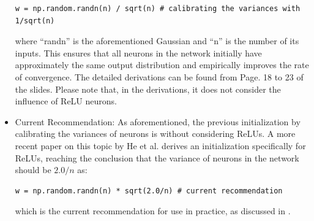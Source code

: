 \documentclass[11pt,fleqn, UTF8]{ctexbook} %
\begin{document}
\begin{itemize}
  \lstset{language=python}
  \begin{lstlisting}[frame=single]
  w = np.random.randn(n) / sqrt(n) # calibrating the variances with 1/sqrt(n)
  \end{lstlisting}
  where “randn” is the aforementioned Gaussian and “n” is the number of its inputs. This ensures that all neurons in the network initially have approximately the same output distribution and empirically improves the rate of convergence. The detailed derivations can be found from Page. 18 to 23 of the slides. Please note that, in the derivations, it does not consider the influence of ReLU neurons.
  \item Current Recommendation:
  As aforementioned, the previous initialization by calibrating the variances of neurons is without considering ReLUs. A more recent paper on this topic by He et al. \cite{he2015delving} derives an initialization specifically for ReLUs, reaching the conclusion that the variance of neurons in the network should be $2.0/n$ as:
  \lstset{language=python}
  \begin{lstlisting}[frame=single]
  w = np.random.randn(n) * sqrt(2.0/n) # current recommendation
  \end{lstlisting}
  which is the current recommendation for use in practice, as discussed in \cite{he2015delving}.
\end{itemize}
\end{document}
